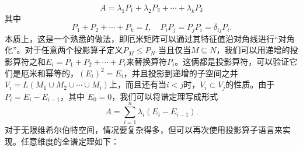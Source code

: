 \documentclass[hyperref,UTF8]{ctexbook}
\begin{document}
\[
A=\lambda_{1} P_{1}+\lambda_{2} P_{2}+\cdots+\lambda_{k} P_{k}
\]
其中
\[
P_{1}+P_{2}+\cdots+P_{k}=I, \quad P_{i} P_{j}=P_{j} P_{i}=\delta_{i j} P_{i} .
\]
本质上，这是一个熟悉的做法，即厄米矩阵可以通过其特征值沿对角线进行“对角化”。对于任意两个投影算子定义\(P_{M} \leq P_{N}\) 当且仅当\(M \subseteq N\)，我们可以用递增的投影算符之和\(E_{i}=P_{1}+P_{2}+\cdots+P_{i}\)来替换算符\(P_{i}\)。这俩都是投影算符，可以验证它们是厄米和幂等的，\(\left(E_{i}\right)^{2}=E_{i}\)，并且投影到递增的子空间之并 \(V_{i }=L\left(M_{1} \cup M_{2} \cup \cdots \cup M_{i}\right)\)上，而且还有当\(i<j\)时，\(V_{i} \subset V_{j}\)的性质。由于\(P_{i}=E_{i}-E_{i-1}\)，其中 \(E_{0}=0\)，我们可以将谱定理写成形式
\[
A=\sum_{i=1}^{n} \lambda_{i}\left(E_{i}-E_{i-1}\right) .
\]
对于无限维希尔伯特空间，情况要复杂得多，但可以再次使用投影算子语言来实现。任意维度的全谱定理如下：
\end{document}
